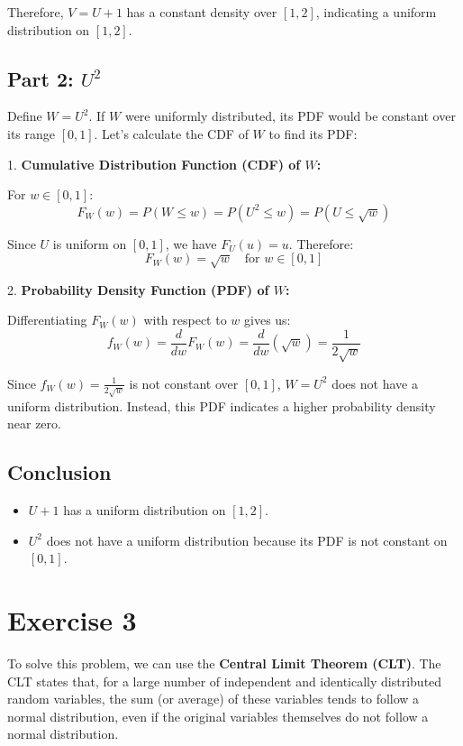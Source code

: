 \documentclass[a4paper,12pt]{article}
\begin{document}
   Therefore, \( V = U + 1 \) has a constant density over \( [1, 2] \), indicating a uniform distribution on \( [1, 2] \).

\subsection*{Part 2: \( U^2 \)}

Define \( W = U^2 \). If \( W \) were uniformly distributed, its PDF would be constant over its range \( [0, 1] \). Let’s calculate the CDF of \( W \) to find its PDF:

1. \textbf{Cumulative Distribution Function (CDF) of \( W \):}

   For \( w \in [0, 1] \):
   \[
   F_W(w) = P(W \le w) = P(U^2 \le w) = P(U \le \sqrt{w})
   \]
   
   Since \( U \) is uniform on \( [0, 1] \), we have \( F_U(u) = u \). Therefore:
   \[
   F_W(w) = \sqrt{w} \quad \text{for } w \in [0, 1]
   \]

2. \textbf{Probability Density Function (PDF) of \( W \):}

   Differentiating \( F_W(w) \) with respect to \( w \) gives us:
   \[
   f_W(w) = \frac{d}{dw} F_W(w) = \frac{d}{dw} (\sqrt{w}) = \frac{1}{2\sqrt{w}}
   \]
   
   Since \( f_W(w) = \frac{1}{2\sqrt{w}} \) is not constant over \( [0, 1] \), \( W = U^2 \) does not have a uniform distribution. Instead, this PDF indicates a higher probability density near zero.
\subsection*{Conclusion}
\begin{itemize}
    \item \( U + 1 \) has a uniform distribution on \( [1, 2] \).
    \item \( U^2 \) does not have a uniform distribution because its PDF is not constant on \( [0, 1] \).
\end{itemize}
\newpage

\section{Exercise 3}
To solve this problem, we can use the \textbf{Central Limit Theorem (CLT)}. The CLT states that, for a large number of independent and identically distributed random variables, the sum (or average) of these variables tends to follow a normal distribution, even if the original variables themselves do not follow a normal distribution.
\end{document}
